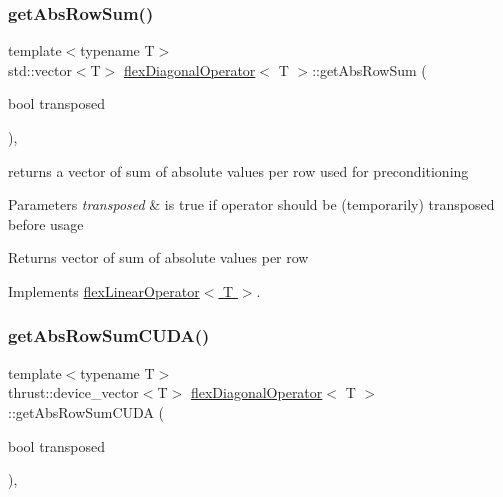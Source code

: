 \subsubsection{\texorpdfstring{get\+Abs\+Row\+Sum()}{getAbsRowSum()}}
{\footnotesize\ttfamily template$<$typename T$>$ \\
std\+::vector$<$T$>$ \hyperlink{classflex_diagonal_operator}{flex\+Diagonal\+Operator}$<$ T $>$\+::get\+Abs\+Row\+Sum (\begin{DoxyParamCaption}\item[{bool}]{transposed }\end{DoxyParamCaption})\hspace{0.3cm}{\ttfamily [inline]}, {\ttfamily [virtual]}}



returns a vector of sum of absolute values per row used for preconditioning 


\begin{DoxyParams}{Parameters}
{\em transposed} & is true if operator should be (temporarily) transposed before usage \\
\hline
\end{DoxyParams}
\begin{DoxyReturn}{Returns}
vector of sum of absolute values per row 
\end{DoxyReturn}


Implements \hyperlink{classflex_linear_operator_ad6caa7b09e6e3c401cadef61b8e2307e}{flex\+Linear\+Operator$<$ T $>$}.

\mbox{\label{classflex_diagonal_operator_a71cdb6ea6b8b7ceabaf538a180c8dcf4}} 
\subsubsection{\texorpdfstring{get\+Abs\+Row\+Sum\+C\+U\+D\+A()}{getAbsRowSumCUDA()}}
{\footnotesize\ttfamily template$<$typename T$>$ \\
thrust\+::device\+\_\+vector$<$T$>$ \hyperlink{classflex_diagonal_operator}{flex\+Diagonal\+Operator}$<$ T $>$\+::get\+Abs\+Row\+Sum\+C\+U\+DA (\begin{DoxyParamCaption}\item[{bool}]{transposed }\end{DoxyParamCaption})\hspace{0.3cm}{\ttfamily [inline]}, {\ttfamily [virtual]}}



